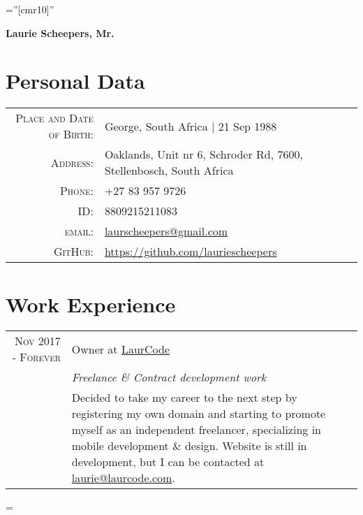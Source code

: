 \documentclass[a4paper,10pt,notitlepage]{article}
\newenvironment{absolutelynopagebreak}
  {\par\nobreak\vfil\penalty0\vfilneg
   \vtop\bgroup}
  {\par\xdef\tpd{\the\prevdepth}\egroup
   \prevdepth=\tpd}
\begin{document}
\pagestyle{empty} %

\font\fb=''[cmr10]'' %


\addtolength{\voffset}{-0.8cm} %

\begin{absolutelynopagebreak}
	
	\begin{center}
		\begin{center}
			\Huge\textbf{Laurie Scheepers, Mr.}
		\end{center}
	\end{center}
		
	\section{Personal Data}
	
	\begin{tabular}{rl}
		\textsc{Place and Date of Birth:} & George, South Africa  | 21 Sep 1988                                 \\
		\textsc{Address:}                 & Oaklands, Unit nr 6, Schroder Rd, 7600, Stellenbosch, South Africa \\
		\textsc{Phone:}                   & +27 83 957 9726                                                     \\
		\textsc{ID:}                      & 8809215211083                                                       \\
		\textsc{email:}                   & \href{mailto:laurscheepers@gmail.com}{laurscheepers@gmail.com}      \\
		\textsc{GitHub:}                  & \href{https://github.com/lauriescheepers}{https://github.com/lauriescheepers}
	\end{tabular}
	
	
	\section{Work Experience}
	\begin{tabular}{r|p{11cm}}
		
		\textsc{Nov 2017 - Forever}  & Owner at \href{www.laurcode.com}{LaurCode}
		\\&\emph{Freelance \& Contract development work}\\&\footnotesize{Decided to take my career to the next step by registering my own domain and starting to promote myself as an independent freelancer, specializing in mobile development \& design. Website is still in development, but I can be contacted at \href{mailto:laurie@laurcode.com}{laurie@laurcode.com}.} \\
		

\end{tabular}
\end{absolutelynopagebreak}
\end{document}
